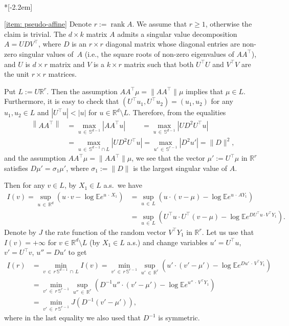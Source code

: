 \documentclass[10pt]{amsart}
\theoremstyle{definition}\newtheorem{defi}[theo]{Definition}\newtheorem{rema}[theo]{Remark}\newtheorem{exam}[theo]{Example}\newtheorem{exem}[theo]{Example}\newtheorem{nota}[theo]{Notation}
\newcommand{\ubar}[1]{\underline{#1}}
\newcommand{\Rbb}{\mathbb{R}}
\newcommand{\E}{\mathbb{E}}
\newcommand{\Sbb}{\mathbb{S}}
\newcommand{\rank}{\mathop{\mathrm{rank}}\nolimits}
\begin{document}
\begin{proofc}\ \\*[-2.2em]

\eqref{item: pseudo-affine} Denote $r:=\rank A$. We assume that $r \ge 1$, otherwise the claim is trivial. The $d \times k$ matrix $A$ admits a singular value decomposition $A = U D V^\top$, where $D$ is an $r \times r$ diagonal matrix whose diagonal entries are non-zero singular values of~$A$ (i.e., the square roots of non-zero eigenvalues of $A A^\top$), and $U$ is $d \times r$ matrix and $V$ is a $k \times r$ matrix such that both $U^\top U$ and $V^\top V$ are the unit $r \times r$ matrices.

Put $L:= U \Rbb^r$. Then the assumption $A A^\top \mu =\|A A^\top \! \| \mu$ implies that $\mu \in L$. Furthermore, it is easy to check that $(U^\top u_1, U^\top u_2) = (u_1, u_2)$ for any $u_1, u_2 \in L$ and $|U^\top u|<|u|$ for $u \in \Rbb^d \setminus L$. Therefore, from the equalities
\begin{align*}
\left\|A A^\top \! \right\| &= \max_{u\,\in\,\Sbb^{d-1}} \left|A A^\top u\right| \qquad\; = \max_{u\,\in\,\Sbb^{d-1}} \left|U D^2 U^\top u\right| \\
&= \max_{u\,\in\,\Sbb^{d-1} \cap L} \left|U D^2 U^\top u\right| =
\max_{u'\,\in\,\Sbb^{r-1}} \left|D^2 u'\right| = \| D\|^2,
\end{align*}
and the assumption $A A^\top \mu =\|A A^\top \! \| \mu$, we see that the vector $\mu':= U^\top \mu$ in $\Rbb^r$ satisfies $D \mu' = \sigma_1 \mu'$, where $\sigma_1:=\|D\|$ is the largest singular value of $A$.

Then for any $v \in L$, by $X_1 \in L$ a.s.\ we have
\begin{align*}
I(v)= \sup_{u\,\in\,\Rbb^d} \left(u \cdot v - \log \E e^{u \,\cdot\,X_1} \right) &=\sup_{u\,\in\,L} \left(u \cdot (v-\mu) - \log \E e^{u\,\cdot\,A Y_1} \right) \\
&= \sup_{u\,\in\,L} \left(U^\top u \cdot U^\top (v - \mu) - \log \E e^{DU^\top u \cdot V^\top Y_1} \right).
\end{align*}
Denote by $J$ the rate function of the random vector $V^\top Y_1$ in $\Rbb^r$. Let us use that $I(v)=+\infty$ for $v \in \Rbb^d \setminus L$ (by $X_1 \in L$ a.s.) and change variables $u' = U^\top u$, $v'= U^\top v$, $u''=Du'$ to get
\begin{align*}
\ubar I (r) &= \min_{v\,\in \,r\,\Sbb^{d-1}\,\cap\,L} I(v) =
\min_{v'\,\in\,r\,\Sbb^{r-1}} \sup_{u'\,\in\,\Rbb^r} \left(u' \cdot (v' - \mu') - \log \E e^{D u'\,\cdot\,V^\top Y_1} \right) \\
& = \min_{v'\,\in\,r\,\Sbb^{r-1}} \sup_{u''\,\in\,\Rbb^r} \left(D^{-1} u'' \cdot (v' - \mu') - \log \E e^{u''\,\cdot\,V^\top Y_1} \right)\\
&= \min_{v'\,\in\,r\,\Sbb^{r-1}} J \left(D^{-1} (v' - \mu')\right),
\end{align*}
where in the last equality we also used that $D^{-1}$ is symmetric.


\end{proofc}
\end{document}
